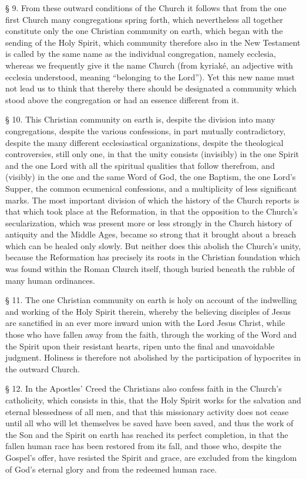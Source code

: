 § 9. From these outward conditions of the Church it follows that from the one first Church many congregations spring forth, which nevertheless all together constitute only the one Christian community on earth, which began with the sending of the Holy Spirit, which community therefore also in the New Testament is called by the same name as the individual congregation, namely ecclesia, whereas we frequently give it the name Church (from kyriaké, an adjective with ecclesia understood, meaning “belonging to the Lord”). Yet this new name must not lead us to think that thereby there should be designated a community which stood above the congregation or had an essence different from it.

§ 10. This Christian community on earth is, despite the division into many congregations, despite the various confessions, in part mutually contradictory, despite the many different ecclesiastical organizations, despite the theological controversies, still only one, in that the unity consists (invisibly) in the one Spirit and the one Lord with all the spiritual qualities that follow therefrom, and (visibly) in the one and the same Word of God, the one Baptism, the one Lord’s Supper, the common ecumenical confessions, and a multiplicity of less significant marks. The most important division of which the history of the Church reports is that which took place at the Reformation, in that the opposition to the Church’s secularization, which was present more or less strongly in the Church history of antiquity and the Middle Ages, became so strong that it brought about a breach which can be healed only slowly. But neither does this abolish the Church’s unity, because the Reformation has precisely its roots in the Christian foundation which was found within the Roman Church itself, though buried beneath the rubble of many human ordinances.

§ 11. The one Christian community on earth is holy on account of the indwelling and working of the Holy Spirit therein, whereby the believing disciples of Jesus are sanctified in an ever more inward union with the Lord Jesus Christ, while those who have fallen away from the faith, through the working of the Word and the Spirit upon their resistant hearts, ripen unto the final and unavoidable judgment. Holiness is therefore not abolished by the participation of hypocrites in the outward Church.

§ 12. In the Apostles’ Creed the Christians also confess faith in the Church’s catholicity, which consists in this, that the Holy Spirit works for the salvation and eternal blessedness of all men, and that this missionary activity does not cease until all who will let themselves be saved have been saved, and thus the work of the Son and the Spirit on earth has reached its perfect completion, in that the fallen human race has been restored from its fall, and those who, despite the Gospel’s offer, have resisted the Spirit and grace, are excluded from the kingdom of God’s eternal glory and from the redeemed human race.

